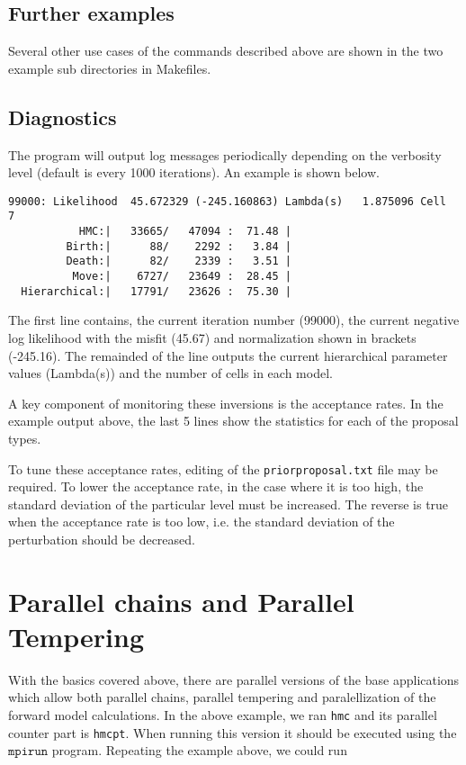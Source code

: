 \documentclass[a4paper,12pt]{article}
\begin{document}
\subsection{Further examples}

Several other use cases of the commands described above are shown in the
two example sub directories in Makefiles.
  
\subsection{Diagnostics}

The program will output log messages periodically depending on the
verbosity level (default is every 1000 iterations). An example
is shown below.

{
  \tiny
\begin{verbatim}
99000: Likelihood  45.672329 (-245.160863) Lambda(s)   1.875096 Cell   7 
           HMC:|   33665/   47094 :  71.48 |
         Birth:|      88/    2292 :   3.84 |
         Death:|      82/    2339 :   3.51 |
          Move:|    6727/   23649 :  28.45 |
  Hierarchical:|   17791/   23626 :  75.30 |
\end{verbatim}
}

The first line contains, the current iteration number (99000), the current
negative log likelihood with the misfit (45.67) and normalization shown
in brackets (-245.16). The remainded of the line outputs the current hierarchical
parameter values (Lambda(s)) and the number of cells in each model.

A key component of monitoring these inversions is the acceptance
rates. In the example output above, the last 5 lines show the statistics
for each of the proposal types. 

To tune these acceptance rates, editing of the {\tt priorproposal.txt}
file may be required. To lower the acceptance rate, in the case where it is too
high, the standard deviation of the particular level must be increased. The
reverse is true when the acceptance rate is too low, i.e. the standard deviation
of the perturbation should be decreased.

\section{Parallel chains and Parallel Tempering}

With the basics covered above, there are parallel versions of the base
applications which allow both parallel chains, parallel tempering and
paralellization of the forward model calculations. In the above
example, we ran \texttt{hmc} and its parallel counter part is
\texttt{hmcpt}. When running this version it should be executed using
the $\texttt{mpirun}$ program. Repeating the example above, we could
run
\end{document}
